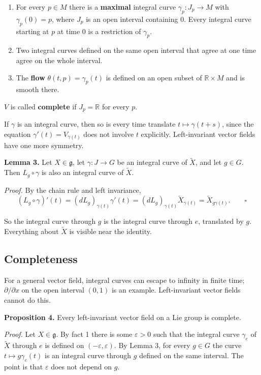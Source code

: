 \documentclass[11pt]{article}
\begin{document}
\begin{enumerate}
  \item For every $p \in M$ there is a \textbf{maximal} integral curve $\gamma_p : J_p \to M$ with $\gamma_p(0) = p$, where $J_p$ is an open interval containing $0$. Every integral curve starting at $p$ at time $0$ is a restriction of $\gamma_p$.
  \item Two integral curves defined on the same open interval that agree at one time agree on the whole interval.
  \item The \textbf{flow} $\theta(t, p) = \gamma_p(t)$ is defined on an open subset of $\mathbb{R} \times M$ and is smooth there.
\end{enumerate}

$V$ is called \textbf{complete} if $J_p = \mathbb{R}$ for every $p$.

If $\gamma$ is an integral curve, then so is every time translate $t \mapsto \gamma(t + s)$, since the equation $\gamma'(t) = V_{\gamma(t)}$ does not involve $t$ explicitly. Left-invariant vector fields have one more symmetry.

\textbf{Lemma 3.} Let $X \in \mathfrak{g}$, let $\gamma : J \to G$ be an integral curve of $\widetilde{X}$, and let $g \in G$. Then $L_g \circ \gamma$ is also an integral curve of $\widetilde{X}$.

\emph{Proof.} By the chain rule and left invariance,
\[
(L_g \circ \gamma)'(t) = (dL_g)_{\gamma(t)} \gamma'(t) = (dL_g)_{\gamma(t)} \widetilde{X}_{\gamma(t)} = \widetilde{X}_{g\gamma(t)}. \qquad \square
\]

So the integral curve through $g$ is the integral curve through $e$, translated by $g$. Everything about $\widetilde{X}$ is visible near the identity.

\subsection{Completeness}

For a general vector field, integral curves can escape to infinity in finite time; $\partial/\partial x$ on the open interval $(0, 1)$ is an example. Left-invariant vector fields cannot do this.

\textbf{Proposition 4.} Every left-invariant vector field on a Lie group is complete.

\emph{Proof.} Let $X \in \mathfrak{g}$. By fact 1 there is some $\varepsilon > 0$ such that the integral curve $\gamma_e$ of $\widetilde{X}$ through $e$ is defined on $(-\varepsilon, \varepsilon)$. By Lemma 3, for every $g \in G$ the curve $t \mapsto g\gamma_e(t)$ is an integral curve through $g$ defined on the same interval. The point is that $\varepsilon$ does not depend on $g$.
\end{document}
